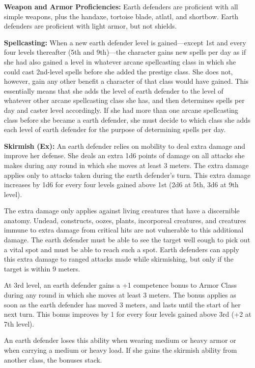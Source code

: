 {
\textbf{Weapon and Armor Proficiencies:} Earth defenders are proficient with all simple  weapons, plus the handaxe, tortoise blade, atlatl, and shortbow. Earth defenders are proficient with light armor, but not shields.

\textbf{Spellcasting:} When a new earth defender level is gained---except 1st and every four levels thereafter (5th and 9th)---the character gains new spells per day as if she had also gained a level in whatever arcane spellcasting class in which she could cast 2nd-level spells before she added the prestige class. She does not, however, gain any other benefit a character of that class would have gained. This essentially means that she adds the level of earth defender to the level of whatever other arcane spellcasting class she has, and then determines spells per day and caster level accordingly. If she had more than one arcane spellcasting class before she became a earth defender, she must decide to which class she adds each level of earth defender for the purpose of determining spells per day.

\textbf{Skirmish (Ex):} An earth defender relies on mobility to deal extra damage and improve her defense. She deals an extra 1d6 points of damage on all attacks she makes during any round in which she moves at least 3 meters. The extra damage applies only to attacks taken during the earth defender's turn. This extra damage increases by 1d6 for every four levels gained above 1st (2d6 at 5th, 3d6 at 9th level).

The extra damage only applies against living creatures that have a discernible anatomy. Undead, constructs, oozes, plants, incorporeal creatures, and creatures immune to extra damage from critical hits are not vulnerable to this additional damage. The earth defender must be able to see the target well eough to pick out a vital spot and must be able to reach such a spot. Earth defenders can apply this extra damage to ranged attacks made while skirmishing, but only if the target is within 9 meters.

At 3rd level, an earth defender gains a +1 competence bonus to Armor Class during any round in which she moves at least 3 meters. The bonus applies as soon as the earth defender has moved 3 meters, and lasts until the start of her next turn. This bonus improves by 1 for every four levels gained above 3rd (+2 at 7th level).

An earth defender loses this ability when wearing medium or heavy armor or when carrying a medium or heavy load. If she gains the skirmish ability from another class, the bonuses stack.

}
